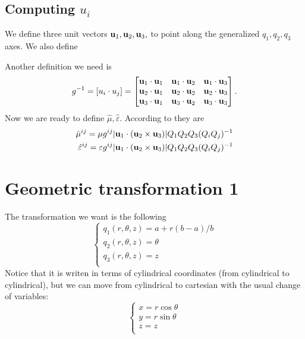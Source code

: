 \documentclass{amsart}
\begin{document}
\subsection{Computing $u_i$}

We define three unit vectors $\textbf{u}_1,\textbf{u}_2,\textbf{u}_3,$ to point along the generalized $q_1,q_2,q_3$ axes.
We also define

Another definition we need is
\begin{equation}\label{matrixg}
  g^{-1}=[u_i\cdot u_j]=\begin{bmatrix}
    \textbf{u}_1\cdot \textbf{u}_1 & \textbf{u}_1\cdot \textbf{u}_2 & \textbf{u}_1\cdot \textbf{u}_3 \\
    \textbf{u}_2\cdot \textbf{u}_1 & \textbf{u}_2\cdot \textbf{u}_2 & \textbf{u}_2\cdot \textbf{u}_3 \\
    \textbf{u}_3\cdot \textbf{u}_1 & \textbf{u}_3\cdot \textbf{u}_2 & \textbf{u}_3\cdot \textbf{u}_3
  \end{bmatrix}.
\end{equation}
Now we are ready to define $\hat{\mu},\hat{\varepsilon}$. According to \cite{ward96} they are
\begin{align}
  \hat{\mu}^{ij}=\mu g^{ij}|\textbf{u}_1\cdot(\textbf{u}_2\times \textbf{u}_3)|Q_1Q_2Q_3(Q_iQ_j)^{-1}\\
  \hat{\varepsilon}^{ij}=\varepsilon g^{ij}|\textbf{u}_1\cdot(\textbf{u}_2\times \textbf{u}_3)|Q_1Q_2Q_3(Q_iQ_j)^{-1} \nonumber
\end{align}

\section{Geometric transformation 1}
The transformation we want is the following
\[\begin{cases}
  q_1(r,\theta,z)=a+r(b-a)/b\\
  q_2(r,\theta,z)=\theta\\
  q_3(r,\theta,z)=z\\
\end{cases}\]
Notice that it is writen in terms of cylindrical coordinates
(from cylindrical to cylindrical), but we can move from cylindrical
to cartesian with the usual change of variables:
\begin{equation}
  \begin{cases}\label{cylindrical}
  x=r\cos\theta\\
  y=r\sin\theta\\
  z=z\\
\end{cases}
\end{equation}
\end{document}
